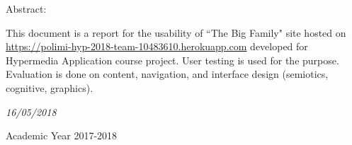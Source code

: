 \documentclass[a4paper,12pt,twoside]{report}
\begin{document}
\begin{center}
\begin{center}
\vspace{10mm}
Abstract:
\vspace{-4mm}
\end{center}
\end{center}
\large{This document is a report for the usability of ``The Big Family" site hosted on \href{https://polimi-hyp-2018-team-10483610.herokuapp.com}{https://polimi-hyp-2018-team-10483610.herokuapp.com} developed for Hypermedia Application course project. User testing is used for the purpose. Evaluation is done on content, navigation, and interface design (semiotics, cognitive, graphics).}
\vspace{10mm}


\begin{center}
\vspace{-4mm}
\it{\large{16/05/2018}}
\end{center}
\begin{center}
\vspace{-4mm}
{\large{Academic Year 2017-2018}}
\end{center}

\end{document}
